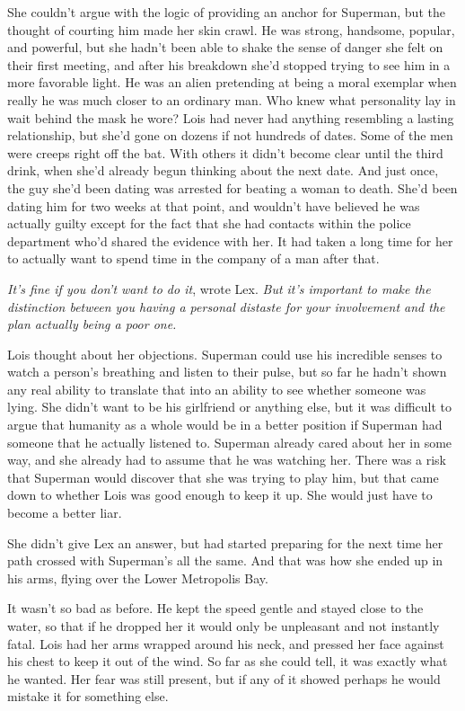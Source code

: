 She couldn't argue with the logic of providing an anchor for Superman,
but the thought of courting him made her skin crawl. He was strong,
handsome, popular, and powerful, but she hadn't been able to shake the
sense of danger she felt on their first meeting, and after his breakdown
she'd stopped trying to see him in a more favorable light. He was an
alien pretending at being a moral exemplar when really he was much
closer to an ordinary man. Who knew what personality lay in wait behind
the mask he wore? Lois had never had anything resembling a lasting
relationship, but she'd gone on dozens if not hundreds of dates. Some of
the men were creeps right off the bat. With others it didn't become
clear until the third drink, when she'd already begun thinking about the
next date. And just once, the guy she'd been dating was arrested for
beating a woman to death. She'd been dating him for two weeks at that
point, and wouldn't have believed he was actually guilty except for the
fact that she had contacts within the police department who'd shared the
evidence with her. It had taken a long time for her to actually want to
spend time in the company of a man after that.

\emph{It's fine if you don't want to do it}, wrote Lex. \emph{But it's
important to make the distinction between you having a personal distaste
for your involvement and the plan actually being a poor one.}

Lois thought about her objections. Superman could use his incredible
senses to watch a person's breathing and listen to their pulse, but so
far he hadn't shown any real ability to translate that into an ability
to see whether someone was lying. She didn't want to be his girlfriend
or anything else, but it was difficult to argue that humanity as a whole
would be in a better position if Superman had someone that he actually
listened to. Superman already cared about her in some way, and she
already had to assume that he was watching her. There was a risk that
Superman would discover that she was trying to play him, but that came
down to whether Lois was good enough to keep it up. She would just have
to become a better liar.

She didn't give Lex an answer, but had started preparing for the next
time her path crossed with Superman's all the same. And that was how she
ended up in his arms, flying over the Lower Metropolis Bay.

It wasn't so bad as before. He kept the speed gentle and stayed close to
the water, so that if he dropped her it would only be unpleasant and not
instantly fatal. Lois had her arms wrapped around his neck, and pressed
her face against his chest to keep it out of the wind. So far as she
could tell, it was exactly what he wanted. Her fear was still present,
but if any of it showed perhaps he would mistake it for something else.

